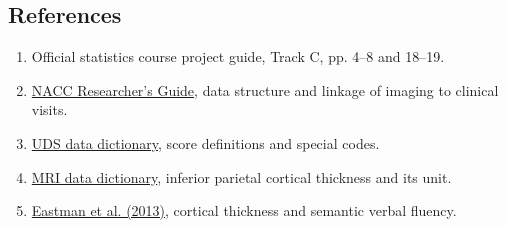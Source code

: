 \documentclass[11pt]{article}
\begin{document}
\subsection*{References}
\begin{enumerate}
\item Official statistics course project guide, Track C, pp. 4--8 and 18--19.
\item \href{https://www.naccdata.org/the-nacc-researchers-guide/}{NACC Researcher's Guide}, data structure and linkage of imaging to clinical visits.
\item \href{https://r2d2.kumc.edu/ADC/Protocols/UDS2_protocol/ResearchDataDict_2015Mar.pdf\#page=205}{UDS data dictionary}, score definitions and special codes.
\item \href{https://files.alz.washington.edu/documentation/SCAN-MRI-Imaging-RDD.pdf\#page=17}{MRI data dictionary}, inferior parietal cortical thickness and its unit.
\item \href{https://pmc.ncbi.nlm.nih.gov/articles/PMC4207059/}{Eastman et al. (2013)}, cortical thickness and semantic verbal fluency.
\end{enumerate}
\end{document}
